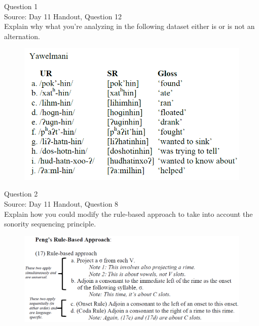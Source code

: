 \documentclass[12pt]{article}
\begin{document}
{\large Question 1}\\

Source: Day 11 Handout, Question 12\\

Explain why what you’re analyzing in the following dataset either is or is not an alternation.\\

\begin{figure}[H]
\includegraphics{../images/yawelmani.png}
\end{figure}

\newpage

{\large Question 2}\\

Source: Day 11 Handout, Question 8\\

Explain how you could modify the rule-based approach to take into account the sonority sequencing principle.\\

\begin{figure}[H]
\includegraphics{../images/peng_rules.png}
\end{figure}

\newpage
\end{document}
